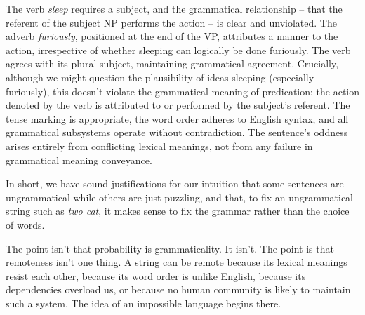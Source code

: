 The verb \textit{sleep} requires a subject, and the grammatical relationship -- that the referent of the subject NP performs the action -- is clear and unviolated. The adverb \textit{furiously}, positioned at the end of the VP, attributes a manner to the action, irrespective of whether sleeping can logically be done furiously. The verb agrees with its plural subject, maintaining grammatical agreement. Crucially, although we might question the plausibility of ideas sleeping (especially furiously), this doesn't violate the grammatical meaning of predication: the action denoted by the verb is attributed to or performed by the subject's referent. The tense marking is appropriate, the word order adheres to English syntax, and all grammatical subsystems operate without contradiction. The sentence's oddness arises entirely from conflicting lexical meanings, not from any failure in grammatical meaning conveyance.

In short, we have sound justifications for our intuition that some sentences are ungrammatical while others are just puzzling, and that, to fix an ungrammatical string such as \textit{two cat}, it makes sense to fix the grammar rather than the choice of words.

The point isn't that probability is grammaticality. It isn't. The point is that remoteness isn't one thing. A string can be remote because its lexical meanings resist each other, because its word order is unlike English, because its dependencies overload us, or because no human community is likely to maintain such a system. The idea of an impossible language begins there.

